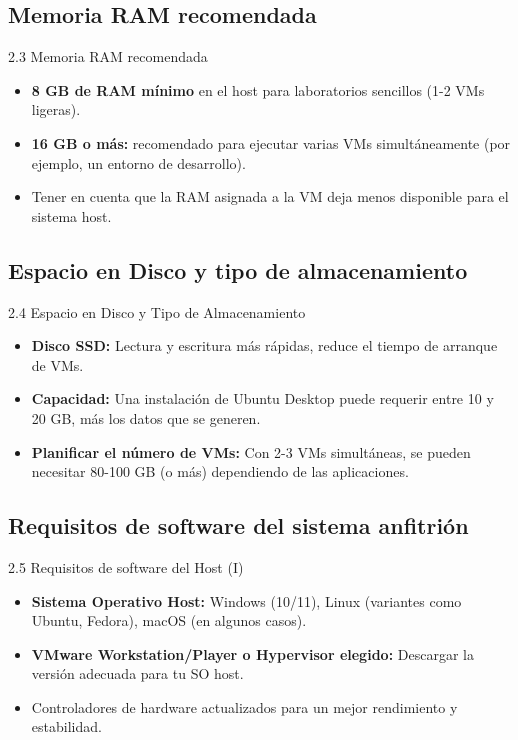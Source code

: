 \documentclass{beamer}
\begin{document}
\subsection{Memoria RAM recomendada}
\begin{frame}{2.3 Memoria RAM recomendada}
    \begin{itemize}
        \item \textbf{8 GB de RAM mínimo} en el host para laboratorios sencillos (1-2 VMs ligeras).
        \item \textbf{16 GB o más:} recomendado para ejecutar varias VMs simultáneamente (por ejemplo, un entorno de desarrollo).
        \item Tener en cuenta que la RAM asignada a la VM deja menos disponible para el sistema host.
    \end{itemize}
\end{frame}

\subsection{Espacio en Disco y tipo de almacenamiento}
\begin{frame}{2.4 Espacio en Disco y Tipo de Almacenamiento}
    \begin{itemize}
        \item \textbf{Disco SSD:} Lectura y escritura más rápidas, reduce el tiempo de arranque de VMs.
        \item \textbf{Capacidad:} Una instalación de Ubuntu Desktop puede requerir entre 10 y 20 GB, más los datos que se generen.
        \item \textbf{Planificar el número de VMs:} Con 2-3 VMs simultáneas, se pueden necesitar 80-100 GB (o más) dependiendo de las aplicaciones.
    \end{itemize}
\end{frame}

\subsection{Requisitos de software del sistema anfitrión}
\begin{frame}{2.5 Requisitos de software del Host (I)}
    \begin{itemize}
        \item \textbf{Sistema Operativo Host:} Windows (10/11), Linux (variantes como Ubuntu, Fedora), macOS (en algunos casos).
        \item \textbf{VMware Workstation/Player o Hypervisor elegido:} Descargar la versión adecuada para tu SO host.
        \item Controladores de hardware actualizados para un mejor rendimiento y estabilidad.
    \end{itemize}
\end{frame}
\end{document}
